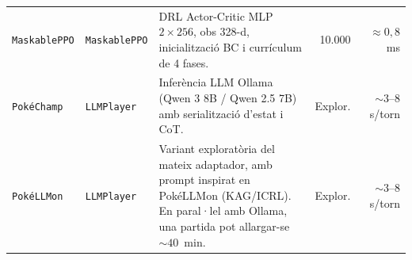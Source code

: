 \begin{table}[htbp]
\begin{tabularx}{\textwidth}{lp{4.0cm}>{\raggedright\arraybackslash}X rr}
\arrayrulecolor{gray!30}\hline\arrayrulecolor{black}
\texttt{MaskablePPO} & \texttt{MaskablePPO} & DRL Actor-Critic MLP $2\times 256$, obs 328-d, inicialització BC i currículum de 4 fases. & 10.000 & $\approx 0{,}8$~ms \\
\arrayrulecolor{gray!30}\hline\arrayrulecolor{black}
\texttt{PokéChamp} & \texttt{LLMPlayer} & Inferència LLM Ollama (Qwen 3 8B / Qwen 2.5 7B) amb serialització d'estat i CoT. & Explor. & $\sim 3$--$8$~s/torn \\
\arrayrulecolor{gray!30}\hline\arrayrulecolor{black}
\texttt{PokéLLMon} & \texttt{LLMPlayer} & Variant exploratòria del mateix adaptador, amb prompt inspirat en PokéLLMon (KAG/ICRL). En paral·lel amb Ollama, una partida pot allargar-se $\sim 40$~min. & Explor. & $\sim 3$--$8$~s/torn \\
\bottomrule
\end{tabularx}
\end{table}

